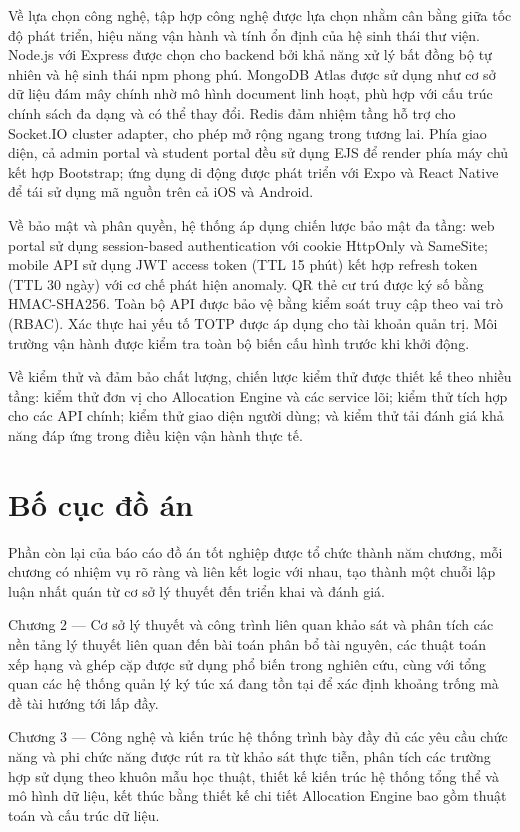 \documentclass[../DoAn.tex]{subfiles}
\begin{document}
Về lựa chọn công nghệ, tập hợp công nghệ được lựa chọn nhằm cân bằng giữa tốc
độ phát triển, hiệu năng vận hành và tính ổn định của hệ sinh thái thư viện.
Node.js với Express được chọn cho backend bởi khả năng xử lý bất đồng bộ tự
nhiên và hệ sinh thái npm phong phú. MongoDB Atlas được sử dụng như cơ sở dữ
liệu đám mây chính nhờ mô hình document linh hoạt, phù hợp với cấu trúc chính
sách đa dạng và có thể thay đổi. Redis đảm nhiệm tầng hỗ trợ cho Socket.IO
cluster adapter, cho phép mở rộng ngang trong tương lai. Phía giao diện, cả
admin portal và student portal đều sử dụng EJS để render phía máy chủ kết hợp
Bootstrap; ứng dụng di động được phát triển với Expo và React Native để tái sử
dụng mã nguồn trên cả iOS và Android.

Về bảo mật và phân quyền, hệ thống áp dụng chiến lược bảo mật đa tầng: web
portal sử dụng session-based authentication với cookie HttpOnly và SameSite;
mobile API sử dụng JWT access token (TTL 15 phút) kết hợp refresh token (TTL 30
ngày) với cơ chế phát hiện anomaly. QR thẻ cư trú được ký số bằng HMAC-SHA256.
Toàn bộ API được bảo vệ bằng kiểm soát truy cập theo vai trò (RBAC). Xác thực
hai yếu tố TOTP được áp dụng cho tài khoản quản trị. Môi trường vận hành được
kiểm tra toàn bộ biến cấu hình trước khi khởi động.

Về kiểm thử và đảm bảo chất lượng, chiến lược kiểm thử được thiết kế theo
nhiều tầng: kiểm thử đơn vị cho Allocation Engine và các service lõi; kiểm thử
tích hợp cho các API chính; kiểm thử giao diện người dùng; và kiểm thử tải
đánh giá khả năng đáp ứng trong điều kiện vận hành thực tế.

\section{Bố cục đồ án}
\label{section:1.4}

Phần còn lại của báo cáo đồ án tốt nghiệp được tổ chức thành năm chương, mỗi
chương có nhiệm vụ rõ ràng và liên kết logic với nhau, tạo thành một chuỗi lập
luận nhất quán từ cơ sở lý thuyết đến triển khai và đánh giá.

Chương 2 --- Cơ sở lý thuyết và công trình liên quan khảo sát và phân tích các
nền tảng lý thuyết liên quan đến bài toán phân bổ tài nguyên, các thuật toán
xếp hạng và ghép cặp được sử dụng phổ biến trong nghiên cứu, cùng với tổng
quan các hệ thống quản lý ký túc xá đang tồn tại để xác định khoảng trống mà
đề tài hướng tới lấp đầy.

Chương 3 --- Công nghệ và kiến trúc hệ thống trình bày đầy đủ các yêu cầu chức
năng và phi chức năng được rút ra từ khảo sát thực tiễn, phân tích các trường
hợp sử dụng theo khuôn mẫu học thuật, thiết kế kiến trúc hệ thống tổng thể và
mô hình dữ liệu, kết thúc bằng thiết kế chi tiết Allocation Engine bao gồm
thuật toán và cấu trúc dữ liệu.
\end{document}
